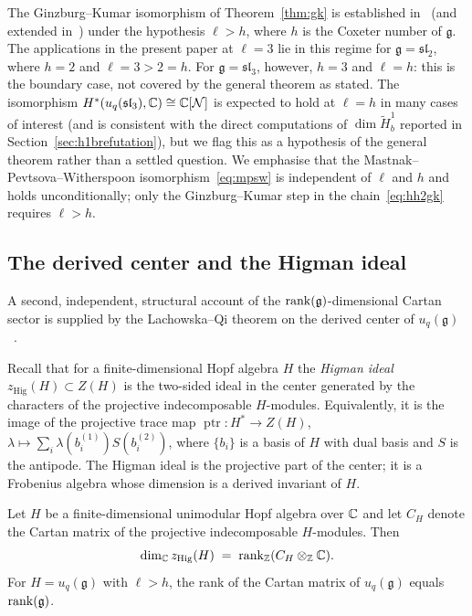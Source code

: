 \begin{remark}[The boundary case $\ell = h$]
\label{rem:ellboundary}
The Ginzburg--Kumar isomorphism of Theorem~\ref{thm:gk} is established in~\cite{GK93} (and extended in~\cite{BNPP}) under the hypothesis $\ell > h$, where $h$ is the Coxeter number of $\mathfrak{g}$. The applications in the present paper at $\ell = 3$ lie in this regime for $\mathfrak{g} = \mathfrak{sl}_2$, where $h = 2$ and $\ell = 3 > 2 = h$. For $\mathfrak{g} = \mathfrak{sl}_3$, however, $h = 3$ and $\ell = h$: this is the boundary case, not covered by the general theorem as stated. The isomorphism $H^*(u_q(\mathfrak{sl}_3), \mathbb{C}) \cong \mathbb{C}[\mathcal{N}]$ is expected to hold at $\ell = h$ in many cases of interest (and is consistent with the direct computations of $\dim \tilde{H}^1_b$ reported in Section~\ref{sec:h1brefutation}), but we flag this as a hypothesis of the general theorem rather than a settled question. We emphasise that the Mastnak--Pevtsova--Witherspoon isomorphism~\eqref{eq:mpsw} is independent of $\ell$ and $h$ and holds unconditionally; only the Ginzburg--Kumar step in the chain~\eqref{eq:hh2gk} requires $\ell > h$.
\end{remark}

\subsection{The derived center and the Higman ideal}
\label{sec:cat_lq}

A second, independent, structural account of the $\operatorname{rank}(\mathfrak{g})$-dimensional Cartan sector is supplied by the Lachowska--Qi theorem on the derived center of $u_q(\mathfrak{g})$~\cite{LQ21}.

Recall that for a finite-dimensional Hopf algebra $H$ the \emph{Higman ideal} $z_{\mathrm{Hig}}(H) \subset Z(H)$ is the two-sided ideal in the center generated by the characters of the projective indecomposable $H$-modules. Equivalently, it is the image of the projective trace map $\operatorname{ptr} \colon H^* \to Z(H)$, $\lambda \mapsto \sum_i \lambda(b_i^{(1)}) S(b_i^{(2)})$, where $\{b_i\}$ is a basis of $H$ with dual basis and $S$ is the antipode. The Higman ideal is the projective part of the center; it is a Frobenius algebra whose dimension is a derived invariant of $H$.

\begin{theorem}
\label{thm:lq}
Let $H$ be a finite-dimensional unimodular Hopf algebra over $\mathbb{C}$ and let $C_H$ denote the Cartan matrix of the projective indecomposable $H$-modules. Then
\begin{equation}
\label{eq:lq}
\dim_{\mathbb{C}} z_{\mathrm{Hig}}(H) \;=\; \operatorname{rank}_{\mathbb{Z}}(C_H \otimes_{\mathbb{Z}} \mathbb{C}).
\end{equation}
For $H = u_q(\mathfrak{g})$ with $\ell > h$, the rank of the Cartan matrix of $u_q(\mathfrak{g})$ equals $\operatorname{rank}(\mathfrak{g})$.
\end{theorem}


